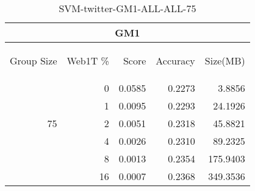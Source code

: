 \begin{center}
\begin{table}[htbp] 
 \begin{center}
\begin{tabular}{ | r | r | r | r | r |}
\hline
\multicolumn{5}{|c|}{GM1}\\
\hline
\begin{sideways}Group Size\end{sideways} & \begin{sideways}Web1T \%\end{sideways} & \begin{sideways}Score\end{sideways} & \begin{sideways}Accuracy\end{sideways} & \begin{sideways}Size(MB)\end{sideways}\\
\hline
\multirow{5}{*}{75}
 & 0 & 0.0585 & 0.2273 & 3.8856\\ \cline{2-5}
 & 1 & 0.0095 & 0.2293 & 24.1926\\ \cline{2-5}
 & 2 & 0.0051 & 0.2318 & 45.8821\\ \cline{2-5}
 & 4 & 0.0026 & 0.2310 & 89.2325\\ \cline{2-5}
 & 8 & 0.0013 & 0.2354 & 175.9403\\ \cline{2-5}
 & 16 & 0.0007 & 0.2368 & 349.3536\\ \cline{2-5}
\hline
\end{tabular}
\caption{SVM-twitter-GM1-ALL-ALL-75}
\label{table:SVM-twitter-GM1-ALL-ALL-75}
\end{center}
 \end{table}
\end{center}

